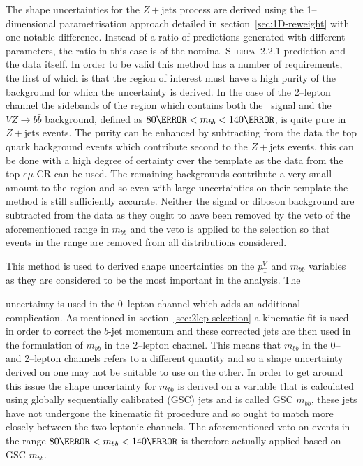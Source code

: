 The shape uncertainties for the $Z+$jets process are derived using the
1--dimensional parametrisation approach detailed in
section~\ref{sec:1D-reweight} with one notable difference. Instead of a ratio of
predictions generated with different parameters, the ratio in this case is of
the nominal \textsc{Sherpa}~2.2.1 prediction and the data itself. In order to be
valid this method has a number of requirements, the first of which is that the
region of interest must have a high purity of the background for which the
uncertainty is derived. In the case of the 2--lepton channel the sidebands of
the region which contains both the \VHbb\ signal and the $V\!Z\!\to\! b\bar{b}$
background, defined as  $80 \GeV < m_{bb} < 140 \GeV$, is quite pure in $Z+$jets
events. The purity can be enhanced by subtracting from the data the top quark
background events which contribute second to the $Z+$jets events, this can be
done with a high degree of certainty over the template as the data from the top
$e\mu$ CR can be used. The remaining backgrounds contribute a very small amount
to the region and so even with large uncertainties on their template the method
is still sufficiently accurate. Neither the signal or diboson background are
subtracted from the data as they ought to have been removed by the veto of the
aforementioned range in $m_{bb}$ and the veto is applied to the selection so
that events in the range are removed from all distributions considered.

This method is used to derived shape uncertainties on the $p_{\mathrm{T}}^V$ and
$m_{bb}$ variables as they are considered to be the most important in the
analysis. The

uncertainty is used in the 0--lepton channel which adds an additional
complication. As mentioned in section~\ref{sec:2lep-selection} a kinematic fit
is used in order to correct the $b$-jet momentum and these corrected jets are then
used in the formulation of $m_{bb}$ in the 2--lepton channel. This means that
$m_{bb}$ in the 0-- and 2--lepton channels refers to a different quantity and so
a shape uncertainty derived on one may not be suitable to use on the other. In
order to get around this issue the shape uncertainty for $m_{bb}$ is derived on
a variable that is calculated using globally sequentially calibrated (GSC) jets
and is called GSC $m_{bb}$, these jets have not undergone the kinematic fit
procedure and so ought to match more closely between the two leptonic channels.
The aforementioned veto on events in the range $80 \GeV < m_{bb} < 140 \GeV$ is
therefore actually applied based on GSC $m_{bb}$.

